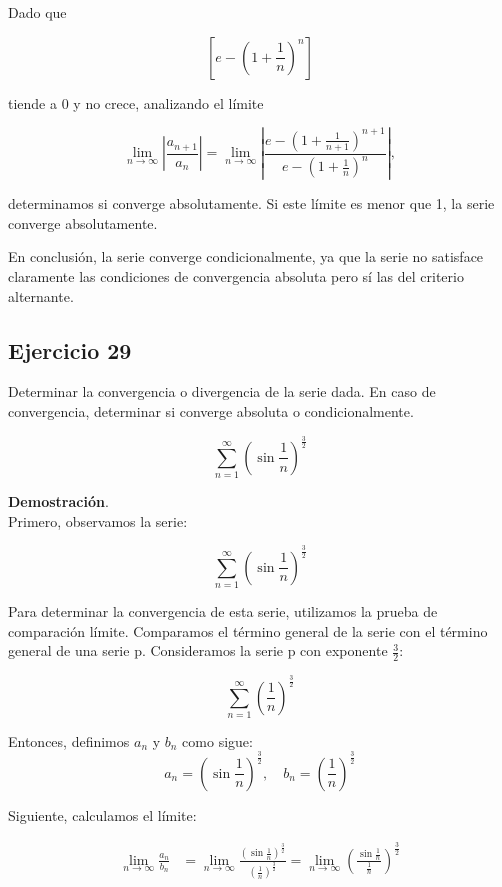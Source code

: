 \documentclass{article}
\begin{document}
    Dado que

    $$\left[e - \left(1 + \frac{1}{n}\right)^n \right]$$

    tiende a 0 y no crece, analizando el límite

    $$
    \lim _{n \rightarrow \infty}\left|\frac{a_{n+1}}{a_{n}}\right| = \lim _{n \rightarrow \infty}\left|\frac{e - \left(1 + \frac{1}{n+1}\right)^{n+1}}{e - \left(1 + \frac{1}{n}\right)^n}\right|,
    $$

    determinamos si converge absolutamente. Si este límite es menor que 1, la serie converge absolutamente.

    En conclusión, la serie converge condicionalmente, ya que la serie no satisface claramente las condiciones de convergencia absoluta pero sí las del criterio alternante.



    \subsection*{Ejercicio 29}

    Determinar la convergencia o divergencia de la serie dada. En caso de convergencia, determinar si converge absoluta o condicionalmente.

    $$
    \sum_{n=1}^{\infty}\left(\sin \frac{1}{n}\right)^{\frac{3}{2}}
    $$

    \textbf{Demostración}.\\

    Primero, observamos la serie:

    $$
    \sum_{n=1}^{\infty}\left(\sin \frac{1}{n}\right)^{\frac{3}{2}}
    $$

    Para determinar la convergencia de esta serie, utilizamos la prueba de comparación límite. Comparamos el término general de la serie con el término general de una serie p. Consideramos la serie p con exponente $\frac{3}{2}$:

    $$
    \sum_{n=1}^{\infty} \left( \frac{1}{n} \right)^{\frac{3}{2}}
    $$

    Entonces, definimos \(a_n\) y \(b_n\) como sigue:
    $$
    a_n = \left(\sin \frac{1}{n}\right)^{\frac{3}{2}}, \quad b_n = \left(\frac{1}{n}\right)^{\frac{3}{2}}
    $$

    Siguiente, calculamos el límite:

    \begin{align*}
    \lim _{n \rightarrow \infty} \frac{a_n}{b_n} &= \lim _{n \rightarrow \infty} \frac{\left(\sin \frac{1}{n}\right)^{\frac{3}{2}}}{\left(\frac{1}{n}\right)^{\frac{3}{2}}}
    = \lim _{n \rightarrow \infty}\left(\frac{\sin \frac{1}{n}}{\frac{1}{n}}\right)^{\frac{3}{2}}
    \end{align*}
\end{document}
